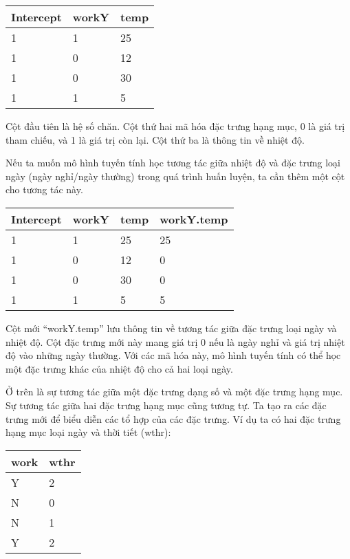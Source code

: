 \begin{table*}[!hbt]
\centering
\begin{tabular}{|l|l|l|}
\hline
Intercept & workY & temp \\ \hline
1         & 1     & 25   \\ \hline
1         & 0     & 12   \\ \hline
1         & 0     & 30   \\ \hline
1         & 1     & 5    \\ \hline
\end{tabular}
\end{table*}

Cột đầu tiên là hệ số chăn. Cột thứ hai mã hóa đặc trưng hạng mục, 0 là giá trị tham chiếu, và 1 là giá trị còn lại. Cột thứ ba là thông tin về nhiệt độ.

Nếu ta muốn mô hình tuyến tính học tương tác giữa nhiệt độ và đặc trưng loại ngày (ngày nghỉ/ngày thường) trong quá trình huấn luyện, ta cần thêm một cột cho tương tác này.

\begin{table*}[!hbt]
\centering
\begin{tabular}{|l|l|l|l|}
\hline
Intercept & workY & temp & workY.temp \\ \hline
1         & 1     & 25   & 25         \\ \hline
1         & 0     & 12   & 0          \\ \hline
1         & 0     & 30   & 0          \\ \hline
1         & 1     & 5    & 5          \\ \hline
\end{tabular}
\end{table*}

Cột mới ``workY.temp'' lưu thông tin về tương tác giữa đặc trưng loại ngày và nhiệt độ. Cột đặc trưng mới này mang giá trị 0 nếu là ngày nghỉ và giá trị nhiệt độ vào những ngày thường. Với các mã hóa này, mô hình tuyến tính có thể học một đặc trưng khác của nhiệt độ cho cả hai loại ngày. 

Ở trên là sự tương tác giữa một đặc trưng dạng số và một đặc trưng hạng mục. Sự tương tác giữa hai đặc trưng hạng mục cũng tương tự. Ta tạo ra các đặc trưng mới để biểu diễn các tổ hợp của các đặc trưng. Ví dụ ta có hai đặc trưng hạng mục loại ngày và thời tiết (wthr):

\begin{table*}[!hbt]
\centering
\begin{tabular}{|l|l|}
\hline
work & wthr \\ \hline
Y    & 2    \\ \hline
N    & 0    \\ \hline
N    & 1    \\ \hline
Y    & 2    \\ \hline
\end{tabular}
\end{table*}


